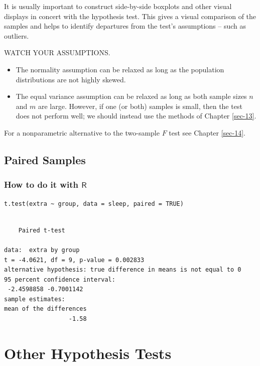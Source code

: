 \documentclass[captions=tableheading]{scrbook}
\begin{document}
\begin{rem}
It is usually important to construct side-by-side boxplots and other visual displays in concert with the hypothesis test. This gives a visual comparison of the samples and helps to identify departures from the test's assumptions -- such as outliers.
\end{rem}

\begin{rem}
WATCH YOUR ASSUMPTIONS.
\begin{itemize}
\item The normality assumption can be relaxed as long as the population distributions are not highly skewed.
\item The equal variance assumption can be relaxed as long as both sample sizes \(n\) and \(m\) are large. However, if one (or both) samples is small, then the test does not perform well; we should instead use the methods of Chapter \ref{sec-13}.
\end{itemize}

\end{rem}

For a nonparametric alternative to the two-sample \(F\) test see Chapter \ref{sec-14}.
\subsection{Paired Samples}
\label{sec-10-4-2}
\subsubsection{How to do it with \(\mathsf{R}\)}
\label{sec-10-4-2-1}



\begin{verbatim}
t.test(extra ~ group, data = sleep, paired = TRUE)
\end{verbatim}


\begin{verbatim}

	Paired t-test

data:  extra by group 
t = -4.0621, df = 9, p-value = 0.002833
alternative hypothesis: true difference in means is not equal to 0 
95 percent confidence interval:
 -2.4598858 -0.7001142 
sample estimates:
mean of the differences 
                  -1.58
\end{verbatim}
\section{Other Hypothesis Tests}
\label{sec-10-5}
\label{sec-Other-Hypothesis-Tests}
\end{document}
